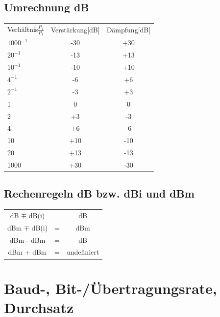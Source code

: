 \documentclass[fs, footer]{latex4ei}
\begin{document}
\begin{multicols*}{4}
{	\subsection{Umrechnung dB}
\begin{tabular}[h]{l|c|c}
	Verhältnis$\frac{P_2}{P_1}$ & Verstärkung[dB] & Dämpfung[dB] \\
	$ 1000^{-1}$ & -30 & +30 \\
	$ 20^{-1} $ & -13 & +13 \\
	$ 10^{-1} $ & -10 & +10 \\ 
	$ 4^{-1} $ & -6 & +6 \\
	$ 2^{-1} $ & -3 & +3 \\
	1 & 0 & 0 \\
	2 & +3 & -3 \\
	4 & +6 & -6 \\
	10 & +10 & -10\\
	20 & +13 & -13 \\
	1000 & +30 & -30  
\end{tabular}

	\subsection{Rechenregeln dB bzw. dBi und dBm}
\begin{tabular}[h]{c c c}
	dB $\mp$ dB(i) 	& = & dB  \\
	dBm $\mp$ dB(i) 	& = & dBm  \\
	dBm - dBm 		& = & dB  \\
	dBm + dBm 		& = & undefiniert
\end{tabular}
}


\section{Baud-, Bit-/Übertragungsrate, Durchsatz}
\end{multicols*}
\end{document}
